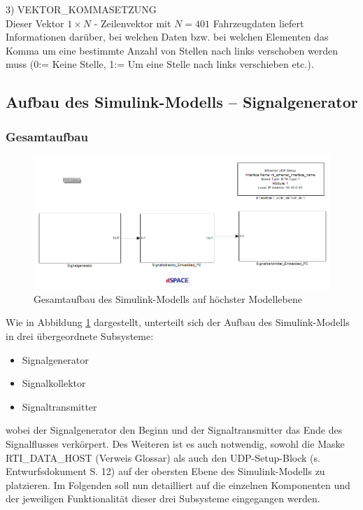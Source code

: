 \documentclass[fontsize = 12pt, paper = a4]{scrreprt}
\begin{document}
3) VEKTOR\_KOMMASETZUNG \\

Dieser Vektor $1 \times N$ - Zeilenvektor mit $N = 401$ Fahrzeugdaten  liefert Informationen darüber, bei welchen Daten bzw. bei welchen Elementen das Komma um eine bestimmte Anzahl von Stellen nach links verschoben werden muss (0:= Keine Stelle, 1:= Um eine Stelle nach links verschieben etc.).


\subsection{Aufbau des Simulink-Modells -- Signalgenerator}

\subsubsection{Gesamtaufbau}

\begin{figure}[h]
\centering
\includegraphics[scale = 0.65]{topmodell}
\caption[Gesamtaufbau Simulink-Modell]{Gesamtaufbau des Simulink-Modells auf höchster Modellebene}
\label{topmodell}
\end{figure}

Wie in Abbildung \ref{topmodell} dargestellt, unterteilt sich der Aufbau des Simulink-Modells in drei übergeordnete Subsysteme: 

\begin{itemize}

\item Signalgenerator
\item Signalkollektor
\item Signaltransmitter

\end{itemize}

wobei der Signalgenerator den Beginn und der Signaltransmitter das Ende des Signalflusses verkörpert. Des Weiteren ist es auch notwendig, sowohl die Maske RTI\_DATA\_HOST (Verweis Glossar) als auch den UDP-Setup-Block (s. Entwurfsdokument S. 12) auf der obersten Ebene des Simulink-Modells zu platzieren. Im Folgenden soll nun detailliert auf die einzelnen Komponenten und der jeweiligen Funktionalität dieser drei Subsysteme eingegangen werden. 
\end{document}
